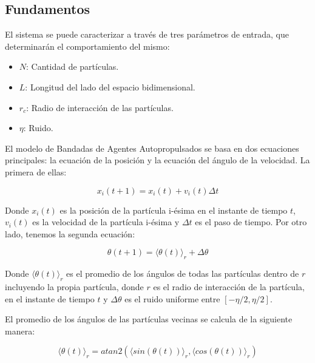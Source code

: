 \documentclass[11pt, a4paper]{article}
\begin{document}
        \subsection{Fundamentos}
        \label{subsec:fundamentos}

            El sistema se puede caracterizar a través de tres parámetros de entrada, que determinarán el comportamiento
            del mismo:

            \begin{itemize}
                \item $N$: Cantidad de partículas.
                \item $L$: Longitud del lado del espacio bidimensional.
                \item $r_c$: Radio de interacción de las partículas.
                \item $\eta$: Ruido.
            \end{itemize}

            El modelo de Bandadas de Agentes Autopropulsados se basa en dos ecuaciones principales: la ecuación de la posición y la ecuación del ángulo de la velocidad.
            La primera de ellas:

            \begin{equation}
                x_i(t+1) = x_i(t) + v_i(t) \Delta t
            \end{equation}

            Donde $x_i(t)$ es la posición de la partícula i-ésima en el instante de tiempo $t$, $v_i(t)$ es la velocidad de la partícula i-ésima
            y $\Delta t$ es el paso de tiempo.
            Por otro lado, tenemos la segunda ecuación:

            \begin{equation}
                \theta(t+1) = \langle \theta(t) \rangle_r+ \Delta \theta
            \end{equation}

            Donde $\langle \theta(t) \rangle_r$ es el promedio de los ángulos de todas las partículas dentro de $r$ incluyendo la propia
            partícula, donde $r$ es el radio de interacción de la partícula, en el instante de tiempo $t$ y
            $\Delta \theta$ es el ruido uniforme entre $[-\eta/2, \eta/2]$.

            El promedio de los ángulos de las partículas vecinas se calcula de la siguiente manera:

            \begin{equation}
                \langle \theta(t) \rangle_r = atan2(\langle sin(\theta(t)) \rangle_r, \langle cos(\theta(t)) \rangle_r)
            \end{equation}
\end{document}
